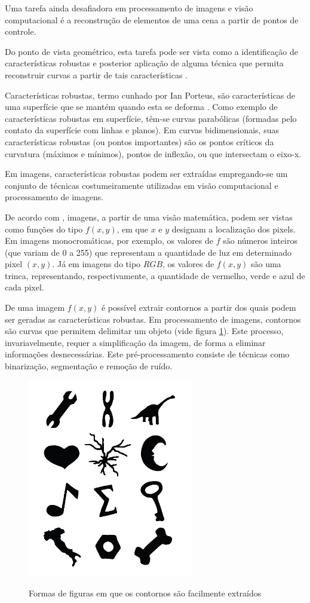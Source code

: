 \documentclass[
	12pt,				%
	oneside,			%
	a4paper,			%
	sumario=tradicional,
	english,			%
	french,				%
	spanish,			%
	brazil,				%
]{abntex2}
\begin{document}
Uma tarefa ainda desafiadora em processamento de imagens e visão computacional é a reconstrução de elementos de uma cena a partir de pontos de controle. 

Do ponto de vista geométrico, esta tarefa pode ser vista como a identificação de características robustas e posterior aplicação de alguma técnica que permita reconstruir curvas a partir de tais características \cite{book_sorkine}.

Características robustas, termo cunhado por Ian Porteus, são características de uma superfície que se mantém quando esta se deforma \cite{book_difgeosing}. Como exemplo de características robustas em superfície, têm-se curvas parabólicas (formadas pelo contato da superfície com linhas e planos). Em curvas bidimensionais, suas características robustas (ou pontos importantes) são os pontos críticos da curvatura (máximos e mínimos), pontos de inflexão, ou que intersectam o eixo-x.

Em imagens, características robustas podem ser extraídas empregando-se um conjunto de técnicas costumeiramente utilizadas em visão computacional e processamento de imagens.

De acordo com , imagens, a partir de uma visão matemática, podem ser vistas como funções do tipo $f(x, y)$, em que $x$ e $y$ designam a localização dos pixels. Em imagens monocromáticas, por exemplo, os valores de $f$ são números inteiros (que variam de 0 a 255) que representam a quantidade de luz em determinado pixel $(x, y)$. Já em imagens do tipo $RGB$, os valores de $f(x, y)$ são uma trinca, representando, respectivamente, a quantidade de vermelho, verde e azul de cada pixel.

De uma imagem $f(x, y)$ é possível extrair contornos a partir dos quais podem ser geradas as características robustas.  Em processamento de imagens, contornos são curvas que permitem delimitar um objeto (vide figura \ref{fig:shape}). Este processo, invariavelmente, requer a simplificação da imagem, de forma a eliminar informações desnecessárias. Este pré-processamento consiste de técnicas como binarização, segmentação e remoção de ruído.

\begin{figure}[htb]
\centering
    \caption{Formas de figuras em que os contornos são facilmente extraídos}
    \includegraphics[width=.35\linewidth]{./img/shapes.png}
    \label{fig:shape}
\end{figure}
\end{document}
